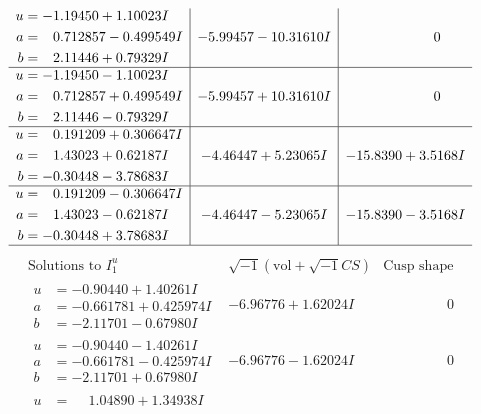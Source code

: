 \documentclass[1p]{elsarticle_modified}
\theoremstyle{definition}
\newcommand{\I}{\sqrt{-1}}
\begin{document}
$$\begin{array}{c|c|c}
\begin{aligned}
u &= -1.19450 + 1.10023 I \\
a &= \phantom{-}0.712857 - 0.499549 I \\
b &= \phantom{-}2.11446 + 0.79329 I\end{aligned}
 & -5.99457 - 10.31610 I & \phantom{-0.000000 } 0 \\ \hline\begin{aligned}
u &= -1.19450 - 1.10023 I \\
a &= \phantom{-}0.712857 + 0.499549 I \\
b &= \phantom{-}2.11446 - 0.79329 I\end{aligned}
 & -5.99457 + 10.31610 I & \phantom{-0.000000 } 0 \\ \hline\begin{aligned}
u &= \phantom{-}0.191209 + 0.306647 I \\
a &= \phantom{-}1.43023 + 0.62187 I \\
b &= -0.30448 - 3.78683 I\end{aligned}
 & -4.46447 + 5.23065 I & -15.8390 + 3.5168 I \\ \hline\begin{aligned}
u &= \phantom{-}0.191209 - 0.306647 I \\
a &= \phantom{-}1.43023 - 0.62187 I \\
b &= -0.30448 + 3.78683 I\end{aligned}
 & -4.46447 - 5.23065 I & -15.8390 - 3.5168 I\\
 \hline 
 \end{array}$$\newpage$$\begin{array}{c|c|c}  
\text{Solutions to }I^u_{1}& \I (\text{vol} + \sqrt{-1}CS) & \text{Cusp shape}\\
 \hline 
\begin{aligned}
u &= -0.90440 + 1.40261 I \\
a &= -0.661781 + 0.425974 I \\
b &= -2.11701 - 0.67980 I\end{aligned}
 & -6.96776 + 1.62024 I & \phantom{-0.000000 } 0 \\ \hline\begin{aligned}
u &= -0.90440 - 1.40261 I \\
a &= -0.661781 - 0.425974 I \\
b &= -2.11701 + 0.67980 I\end{aligned}
 & -6.96776 - 1.62024 I & \phantom{-0.000000 } 0 \\ \hline\begin{aligned}
u &= \phantom{-}1.04890 + 1.34938 I \\

\end{aligned}
\end{array}$$
\end{document}

